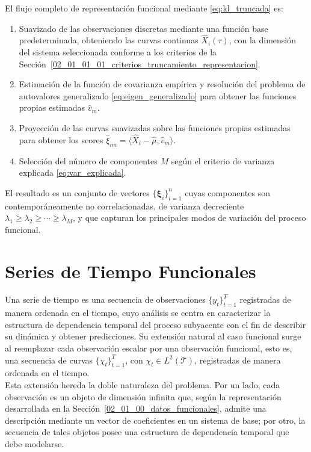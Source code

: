 El flujo completo de representación funcional mediante \eqref{eq:kl_truncada} es:
\begin{enumerate}
    \item Suavizado de las observaciones discretas mediante una función base predeterminada, obteniendo las curvas continuas $\widehat{X}_i(\tau)$, con la dimensión del sistema seleccionada conforme a los criterios de la Sección~\ref{02_01_01_01_criterios_truncamiento_representacion}.
    \item Estimación de la función de covarianza empírica y resolución del problema de autovalores generalizado \eqref{eq:eigen_generalizado} para obtener las funciones propias estimadas $\hat{v}_m$.
    \item Proyección de las curvas suavizadas sobre las funciones propias estimadas para obtener los scores $\hat{\xi}_{im} = \langle \widehat{X}_i - \hat{\mu}, \hat{v}_m \rangle$.
    \item Selección del número de componentes $M$ según el criterio de varianza explicada \eqref{eq:var_explicada}.
\end{enumerate}

El resultado es un conjunto de vectores $\{\boldsymbol{\xi}_i\}_{i=1}^{n}$ cuyas componentes son contemporáneamente no correlacionadas, de varianza decreciente $\lambda_1 \geq \lambda_2 \geq \cdots \geq \lambda_M$, y que capturan los principales modos de variación del proceso funcional.

\section{Series de Tiempo Funcionales}
\label{02_02_00_series_tiempo_funcionales}
Una serie de tiempo es una secuencia de observaciones $\{y_t\}_{t=1}^{T}$ registradas de manera ordenada en el tiempo, cuyo análisis se centra en caracterizar la estructura de dependencia temporal del proceso subyacente con el fin de describir su dinámica y obtener predicciones. Su extensión natural al caso funcional surge al reemplazar cada observación escalar por una observación funcional, esto es, una secuencia de curvas $\{\chi_t\}_{t=1}^{T}$, con $\chi_t \in L^2(\mathcal{T})$, registradas de manera ordenada en el tiempo.\\

Esta extensión hereda la doble naturaleza del problema. Por un lado, cada observación es un objeto de dimensión infinita que, según la representación desarrollada en la Sección~\ref{02_01_00_datos_funcionales}, admite una descripción mediante un vector de coeficientes en un sistema de base; por otro, la secuencia de tales objetos posee una estructura de dependencia temporal que debe modelarse.

